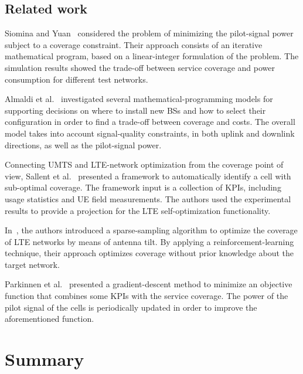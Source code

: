 \subsection*{Related work}

Siomina and Yuan~\cite{Siomina:Minimum.pilot.power.for.service.coverage}
considered the problem of minimizing the pilot-signal power subject
to a coverage constraint. Their approach consists of an iterative
mathematical program, based on a linear-integer formulation of the
problem. The simulation results showed the trade-off between service
coverage and power consumption for different test networks.

Almaldi et al.~\cite{Amaldi-Radio_planning_and_coverage_optimization_of_3G_networks:2008}
investigated several mathematical-programming models for supporting
decisions on where to install new BSs and how to select their configuration
in order to find a trade-off between coverage and costs. The overall
model takes into account signal-quality constraints, in both uplink
and downlink directions, as well as the pilot-signal power.

Connecting UMTS and LTE-network optimization from the coverage point
of view, Sallent et al.~\cite{Sallent-A_roadmap_from_UMTS_to_LTE_optimization:2011}
presented a framework to automatically identify a cell with sub-optimal
coverage. The framework input is a collection of KPIs, including usage
statistics and UE field measurements. The authors used the experimental
results to provide a projection for the LTE self-optimization functionality.

In~\cite{Thampi-A_sparse_sampling_algorithm_for_self_optimization_of_coverage_in_LTE:2012},
the authors introduced a sparse-sampling algorithm to optimize the
coverage of LTE networks by means of antenna tilt. By applying a reinforcement-learning
technique, their approach optimizes coverage without prior knowledge
about the target network.

Parkinnen et al.~\cite{Coverage.optimization.with.cost.function:2002}
presented a gradient-descent method to minimize an objective function
that combines some KPIs with the service coverage. The power of the
pilot signal of the cells is periodically updated in order to improve
the aforementioned function.




\section{Summary}

